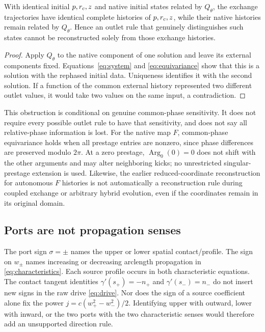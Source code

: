 \begin{proposition}\label{prop:phase}
With identical initial $p,r_c,z$ and native initial states related by $Q_\theta$, the exchange trajectories have identical complete histories of $p,r_c,z$, while their native histories remain related by $Q_\theta$. Hence an outlet rule that genuinely distinguishes such states cannot be reconstructed solely from those exchange histories.
\end{proposition}
\begin{proof}
Apply $Q_\theta$ to the native component of one solution and leave its external components fixed. Equations~\eqref{eq:system} and \eqref{eq:equivariance} show that this is a solution with the rephased initial data. Uniqueness identifies it with the second solution. If a function of the common external history represented two different outlet values, it would take two values on the same input, a contradiction.
\end{proof}

This obstruction is conditional on genuine common-phase sensitivity. It does not require every possible outlet rule to have that sensitivity, and does not say all relative-phase information is lost. For the native map $F$, common-phase equivariance holds when all prestage entries are nonzero, since phase differences are preserved modulo $2\pi$. At a zero prestage, $\operatorname{Arg}_0(0)=0$ does not shift with the other arguments and may alter neighboring kicks; no unrestricted singular-prestage extension is used. Likewise, the earlier reduced-coordinate reconstruction for autonomous $F$ histories \cite{AX} is not automatically a reconstruction rule during coupled exchange or arbitrary hybrid evolution, even if the coordinates remain in its original domain.

\subsection{Ports are not propagation senses}\label{sec:labels}
The port sign $\sigma=\pm$ names the upper or lower spatial contact/profile. The sign on $w_\pm$ names increasing or decreasing arclength propagation in \eqref{eq:characteristics}. Each source profile occurs in both characteristic equations. The contact tangent identities $\gamma'(s_+)=-n_+$ and $\gamma'(s_-)=n_-$ do not insert new signs in the raw drive \eqref{eq:drive}. Nor does the sign of a source coefficient alone fix the power $j=c(w_+^2-w_-^2)/2$. Identifying upper with outward, lower with inward, or the two ports with the two characteristic senses would therefore add an unsupported direction rule.

